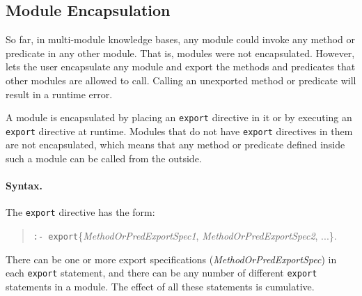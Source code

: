\documentclass[11pt]{article}
\newcommand{\ERGO}{\mbox{\smaller{\ensuremath{\cal{E}}\smaller{{\sc{RGO}}}}}\xspace}
\newcommand{\FLSYSTEM}{\ERGO}
\begin{document}
\subsection{Module Encapsulation}\label{sec-module-encap}

So far, in multi-module knowledge bases, any module could invoke any method or
predicate in any other module. That is, modules were not encapsulated.
However, \FLSYSTEM lets the user encapsulate any module and export the
methods and predicates that other modules are allowed to call. Calling
an unexported method or predicate will result in a runtime error.

A module is encapsulated by placing an {\tt export} directive in it or by
executing an {\tt export} directive at runtime.  Modules that do not have
{\tt export} directives in them are not encapsulated, which means that any
method or predicate defined inside such a module can be called from the outside.

\paragraph{Syntax.}
The {\tt export} directive has the form:
\begin{quote}
  {\tt :- export}\{\emph{MethodOrPredExportSpec1},
  \emph{MethodOrPredExportSpec2}, ...\}.
\end{quote}
There can be one or more export specifications
(\emph{MethodOrPredExportSpec}) in each {\tt export} statement, and there
can be any number of different {\tt export} statements in a module. The
effect of all 
these statements is cumulative.   
\end{document}
